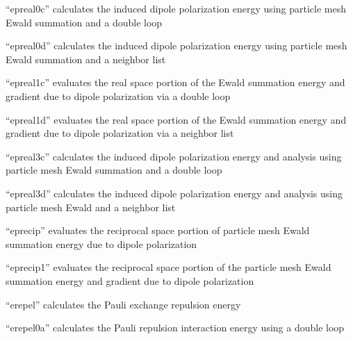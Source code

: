 \documentclass[letterpaper,11pt,english]{sphinxmanual}
\begin{document}
\sphinxAtStartPar
“epreal0c” calculates the induced dipole polarization energy using particle mesh Ewald summation and a double loop

\sphinxAtStartPar
{}

\sphinxAtStartPar
“epreal0d” calculates the induced dipole polarization energy using particle mesh Ewald summation and a neighbor list

\sphinxAtStartPar
{}

\sphinxAtStartPar
“epreal1c” evaluates the real space portion of the Ewald summation energy and gradient due to dipole polarization via a double loop

\sphinxAtStartPar
{}

\sphinxAtStartPar
“epreal1d” evaluates the real space portion of the Ewald summation energy and gradient due to dipole polarization via a neighbor list

\sphinxAtStartPar
{}

\sphinxAtStartPar
“epreal3c” calculates the induced dipole polarization energy and analysis using particle mesh Ewald summation and a double loop

\sphinxAtStartPar
{}

\sphinxAtStartPar
“epreal3d” calculates the induced dipole polarization energy and analysis using particle mesh Ewald and a neighbor list

\sphinxAtStartPar
{}

\sphinxAtStartPar
“eprecip” evaluates the reciprocal space portion of particle mesh Ewald summation energy due to dipole polarization

\sphinxAtStartPar
{}

\sphinxAtStartPar
“eprecip1” evaluates the reciprocal space portion of the particle mesh Ewald summation energy and gradient due to dipole polarization

\sphinxAtStartPar
{}

\sphinxAtStartPar
{}

\sphinxAtStartPar
“erepel” calculates the Pauli exchange repulsion energy

\sphinxAtStartPar
{}

\sphinxAtStartPar
“erepel0a” calculates the Pauli repulsion interaction energy using a double loop
\end{document}
